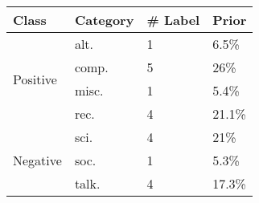 \begin{tabular}{@{}llll@{}}
  \toprule
  Class    & Category & \# Label & Prior \\\midrule
  \multirow{4}{*}{Positive} & alt.   & 1 & 6.5\%  \\
                            & comp.  & 5 & 26\%   \\
                            & misc.  & 1 & 5.4\%  \\
                            & rec.   & 4 & 21.1\% \\\midrule
  \multirow{3}{*}{Negative} & sci.   & 4 & 21\%   \\
                            & soc.   & 1 & 5.3\%  \\
                            & talk.  & 4 & 17.3\% \\
  \bottomrule
\end{tabular}
